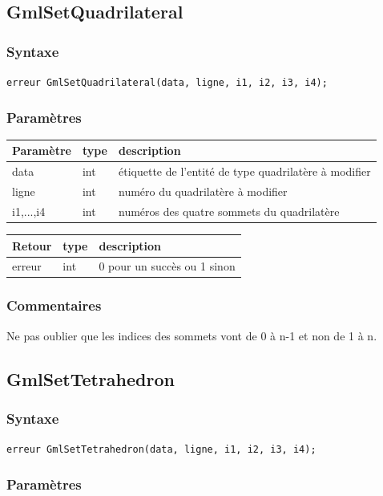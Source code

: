 \documentclass[a4paper,12pt]{article}
\begin{document}
\subsection{GmlSetQuadrilateral}
\subsubsection*{Syntaxe}
{\tt erreur GmlSetQuadrilateral(data, ligne, i1, i2, i3, i4);}
\subsubsection*{Paramètres}

\begin{tabular}{|m{2cm}|m{1.5cm}|m{10.5cm}|}
\hline
Paramètre  & type   & description \\
\hline
data       & int    & étiquette de l'entité de type quadrilatère à modifier \\
\hline
ligne      & int    & numéro du quadrilatère à modifier \\
\hline
i1,...,i4  & int    & numéros des quatre sommets du quadrilatère \\
\hline
\end{tabular}

\medskip

\begin{tabular}{|m{2cm}|m{1.5cm}|m{10.5cm}|}
\hline
Retour     & type   & description \\
\hline
erreur     & int    & 0 pour un succès ou 1 sinon \\
\hline
\end{tabular}
\subsubsection*{Commentaires}
Ne pas oublier que les indices des sommets vont de 0 à n-1 et non de 1 à n.


\subsection{GmlSetTetrahedron}
\subsubsection*{Syntaxe}
{\tt erreur GmlSetTetrahedron(data, ligne, i1, i2, i3, i4);}
\subsubsection*{Paramètres}
\end{document}

